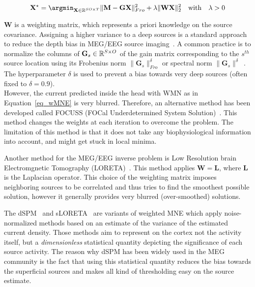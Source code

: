 \begin{equation}\label{eq_wMNE}
\mathbf{X}^\star = \argmin_{\mathbf{X}\in\RR^{SO\times T}} \|\mathbf{M}-\mathbf{GX}\|_{Fro}^2 + \lambda\|\mathbf{WX}\|_2^2 \hspace{10pt} \mathrm{with} \hspace{10pt} \lambda > 0
\end{equation}

$\mathbf{W}$ is a weighting matrix, which represents a priori knowledge on the source covariance. Assigning a higher variance to a deep sources is a standard approach to reduce the depth bias in MEG/EEG source imaging~\cite{lin2006assessing, TF-MxNE,haufe2008combining, haufe2011large,huang2014meg,palmero2007swloreta}. A common practice is to normalize the columns of $\mathbf{G}_s\in\mathbb{R}^{S\times O}$ of the gain matrix corresponding to the $s^{th}$ source location using its Frobenius norm $\|\mathbf{G}_s\|^\delta_{Fro}$ or spectral norm $\|\mathbf{G}_s\|^\delta$~\cite{mne,TF-MxNE, kohler2006depth}. The hyperparameter $\delta$ is used to prevent a bias towards very deep sources (often fixed to $\delta=0.9$).\\

However, the current predicted inside the head with WMN as in Equation~\eqref{eq_wMNE} is very blurred. Therefore, an alternative method has been developed called FOCUSS (FOCal Underdetermined System Solution)~\cite{gorodnitsky1995neuromagnetic}. This method changes the weights at each iteration to overcome the problem. The limitation of this method is that it does not take any biophysiological information into account, and might get stuck in local minima.

Another method for the MEG/EEG inverse problem is Low Resolution brain Electromgnetic Tomography (LORETA)~\cite{pascual1994low}. This method applies $\mathbf{W}=\mathbf{L}$, where $\mathbf{L}$ is the Laplacian operator. This choice of the weighting matrix imposes neighboring sources to be correlated and thus tries to find the smoothest possible solution, however it generally provides very blurred (over-smoothed) solutions.

The dSPM~\cite{dale2000dynamic} and sLORETA~\cite{pascual2002standardized} are variants of weighted MNE which apply noise-normalized methods based on an estimate of the variance of the estimated current density. Those methods aim to represent on the cortex not the activity itself, but a \textit{dimensionless} statistical quantity depicting the significance of each source activity. The reason why dSPM has been widely used in the MEG community is the fact that using this statistical quantity reduces the bias towards the superficial sources and makes all kind of thresholding easy on the source estimate.

